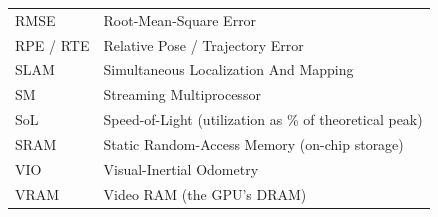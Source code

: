 \begin{longtable}{@{}p{}p{}@{}}
RMSE & Root-Mean-Square Error \\
RPE / RTE & Relative Pose / Trajectory Error \\
SLAM & Simultaneous Localization And Mapping \\
SM & Streaming Multiprocessor \\
SoL & Speed-of-Light (utilization as \% of theoretical peak) \\
SRAM & Static Random-Access Memory (on-chip storage) \\
VIO & Visual-Inertial Odometry \\
VRAM & Video RAM (the GPU's DRAM) \\
\end{longtable}
